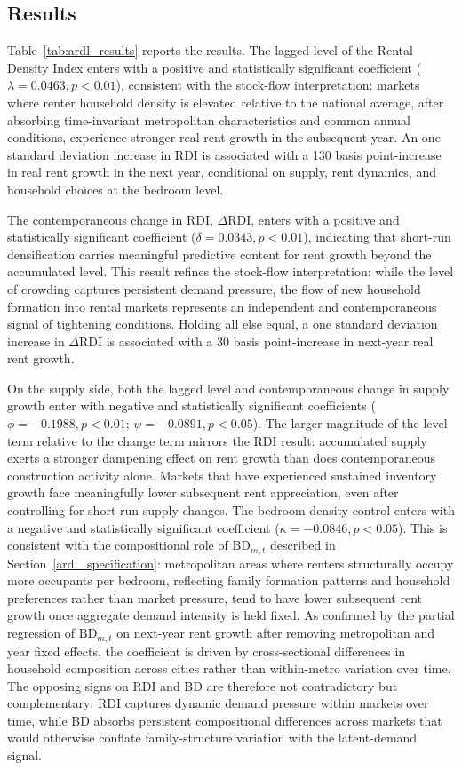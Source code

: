 \documentclass[pdflatex,sn-basic]{sn-jnl}%
\theoremstyle{thmstyleone}%
\theoremstyle{thmstyletwo}%
\theoremstyle{thmstylethree}%
\begin{document}
\subsection{Results}

Table~\ref{tab:ardl_results} reports the results. The lagged level of the Rental Density 
Index enters with a positive and statistically significant coefficient 
($\lambda = 0.0463, p < 0.01$), consistent with the stock-flow interpretation: 
markets where renter household density is elevated relative to the national 
average, after absorbing time-invariant metropolitan characteristics and common 
annual conditions, experience stronger real rent growth in the subsequent year. 
An one standard deviation increase in RDI is associated with a 130 basis point-increase in real rent growth in the next year, conditional on supply, rent dynamics, and household choices at
the bedroom level.

The contemporaneous change in RDI, $\Delta\text{RDI}$, enters with a positive 
and statistically significant coefficient ($\delta = 0.0343, p < 0.01$), 
indicating that short-run densification carries meaningful predictive content for 
rent growth beyond the accumulated level. This result refines the stock-flow 
interpretation: while the level of crowding captures persistent demand pressure, 
the flow of new household formation into rental markets represents an independent 
and contemporaneous signal of tightening conditions. Holding all else equal, a one standard deviation increase in $\Delta\text{RDI}$ is associated with a 30 basis point-increase in next-year real rent growth.

On the supply side, both the lagged level and contemporaneous change in supply 
growth enter with negative and statistically significant coefficients 
($\phi = -0.1988, p < 0.01$; $\psi = -0.0891, p < 0.05$). The larger magnitude 
of the level term relative to the change term mirrors the RDI result: accumulated 
supply exerts a stronger dampening effect on rent growth than does contemporaneous 
construction activity alone. Markets that have experienced sustained inventory 
growth face meaningfully lower subsequent rent appreciation, even after controlling 
for short-run supply changes.
The bedroom density control enters with a negative and statistically significant
coefficient ($\kappa = -0.0846, p < 0.05$). This is consistent with the
compositional role of $\text{BD}_{m,t}$ described in
Section~\ref{ardl_specification}: metropolitan areas where renters structurally
occupy more occupants per bedroom, reflecting family formation patterns and
household preferences rather than market pressure, tend to have lower subsequent
rent growth once aggregate demand intensity is held fixed. As confirmed by the
partial regression of $\text{BD}_{m,t}$ on next-year rent growth after removing
metropolitan and year fixed effects, the coefficient is driven by cross-sectional
differences in household composition across cities rather than within-metro
variation over time. The opposing signs on RDI and BD are therefore not
contradictory but complementary: RDI captures dynamic demand pressure within
markets over time, while BD absorbs persistent compositional differences across
markets that would otherwise conflate family-structure variation with the
latent-demand signal.
\end{document}
